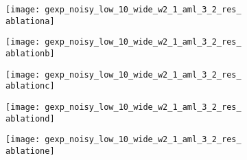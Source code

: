 \begin{figure}[tp]
    \vspace*{-\figskipabove px}
    \vspace{4px}
    \centering
    {\scriptsize
        
    \newcommand{\ablationa}{33}
    \newcommand{\ablationb}{99}
    \newcommand{\ablationc}{528}
    \newcommand{\ablationd}{693}
    \newcommand{\ablatione}{231}
    \newcommand{\ablationf}{396} %
    
    \begin{subfigure}[t]{0.01\textwidth}
        \vspace{0px}\centering
    \end{subfigure}
    \begin{subfigure}[t]{0.07\textwidth}
        \vspace{0px}\centering
        \texttt{[image: gexp\_noisy\_low\_10\_wide\_w2\_1\_aml\_3\_2\_res\_\\ablationa]}
    \end{subfigure}
    \begin{subfigure}[t]{0.07\textwidth}
        \vspace{0px}\centering
        \texttt{[image: gexp\_noisy\_low\_10\_wide\_w2\_1\_aml\_3\_2\_res\_\\ablationb]}
    \end{subfigure}
    \begin{subfigure}[t]{0.07\textwidth}
        \vspace{0px}\centering
        \texttt{[image: gexp\_noisy\_low\_10\_wide\_w2\_1\_aml\_3\_2\_res\_\\ablationc]}
    \end{subfigure}
    \begin{subfigure}[t]{0.07\textwidth}
        \vspace{0px}\centering
        \texttt{[image: gexp\_noisy\_low\_10\_wide\_w2\_1\_aml\_3\_2\_res\_\\ablationd]}
    \end{subfigure}
    \begin{subfigure}[t]{0.07\textwidth}
        \vspace{0px}\centering
        \texttt{[image: gexp\_noisy\_low\_10\_wide\_w2\_1\_aml\_3\_2\_res\_\\ablatione]}

\end{subfigure}}
\end{figure}
